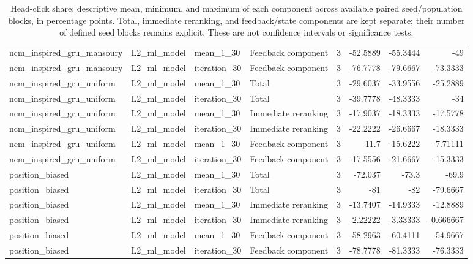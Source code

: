 \begin{table}[htbp!]
\begin{tabular}{llllrrrr}
ncm\_inspired\_gru\_mansoury & L2\_ml\_model & mean\_1\_30 & Feedback component & 3 & -52.5889 & -55.3444 & -49 \\
ncm\_inspired\_gru\_mansoury & L2\_ml\_model & iteration\_30 & Feedback component & 3 & -76.7778 & -79.6667 & -73.3333 \\
ncm\_inspired\_gru\_uniform & L2\_ml\_model & mean\_1\_30 & Total & 3 & -29.6037 & -33.9556 & -25.2889 \\
ncm\_inspired\_gru\_uniform & L2\_ml\_model & iteration\_30 & Total & 3 & -39.7778 & -48.3333 & -34 \\
ncm\_inspired\_gru\_uniform & L2\_ml\_model & mean\_1\_30 & Immediate reranking & 3 & -17.9037 & -18.3333 & -17.5778 \\
ncm\_inspired\_gru\_uniform & L2\_ml\_model & iteration\_30 & Immediate reranking & 3 & -22.2222 & -26.6667 & -18.3333 \\
ncm\_inspired\_gru\_uniform & L2\_ml\_model & mean\_1\_30 & Feedback component & 3 & -11.7 & -15.6222 & -7.71111 \\
ncm\_inspired\_gru\_uniform & L2\_ml\_model & iteration\_30 & Feedback component & 3 & -17.5556 & -21.6667 & -15.3333 \\
position\_biased & L2\_ml\_model & mean\_1\_30 & Total & 3 & -72.037 & -73.3 & -69.9 \\
position\_biased & L2\_ml\_model & iteration\_30 & Total & 3 & -81 & -82 & -79.6667 \\
position\_biased & L2\_ml\_model & mean\_1\_30 & Immediate reranking & 3 & -13.7407 & -14.9333 & -12.8889 \\
position\_biased & L2\_ml\_model & iteration\_30 & Immediate reranking & 3 & -2.22222 & -3.33333 & -0.666667 \\
position\_biased & L2\_ml\_model & mean\_1\_30 & Feedback component & 3 & -58.2963 & -60.4111 & -54.9667 \\
position\_biased & L2\_ml\_model & iteration\_30 & Feedback component & 3 & -78.7778 & -81.3333 & -76.3333 \\
\hline
\end{tabular}
\caption{Head-click share: descriptive mean, minimum, and maximum of each component across available paired seed/population blocks, in percentage points. Total, immediate reranking, and feedback/state components are kept separate; their number of defined seed blocks remains explicit. These are not confidence intervals or significance tests.}
\label{chap:results:tab:rq4_post_processing_head_click_share_component_seed_consistency}
\end{table}
